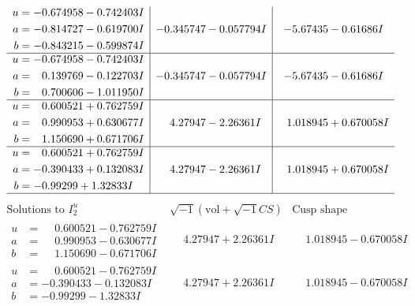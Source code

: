 \documentclass[1p]{elsarticle_modified}
\theoremstyle{definition}
\newcommand{\I}{\sqrt{-1}}
\begin{document}
$$\begin{array}{c|c|c}
\begin{aligned}
u &= -0.674958 - 0.742403 I \\
a &= -0.814727 - 0.619700 I \\
b &= -0.843215 - 0.599874 I\end{aligned}
 & -0.345747 - 0.057794 I & -5.67435 - 0.61686 I \\ \hline\begin{aligned}
u &= -0.674958 - 0.742403 I \\
a &= \phantom{-}0.139769 - 0.122703 I \\
b &= \phantom{-}0.700606 - 1.011950 I\end{aligned}
 & -0.345747 - 0.057794 I & -5.67435 - 0.61686 I \\ \hline\begin{aligned}
u &= \phantom{-}0.600521 + 0.762759 I \\
a &= \phantom{-}0.990953 + 0.630677 I \\
b &= \phantom{-}1.150690 + 0.671706 I\end{aligned}
 & \phantom{-}4.27947 - 2.26361 I & \phantom{-}1.018945 + 0.670058 I \\ \hline\begin{aligned}
u &= \phantom{-}0.600521 + 0.762759 I \\
a &= -0.390433 + 0.132083 I \\
b &= -0.99299 + 1.32833 I\end{aligned}
 & \phantom{-}4.27947 - 2.26361 I & \phantom{-}1.018945 + 0.670058 I\\
 \hline 
 \end{array}$$\newpage$$\begin{array}{c|c|c}  
\text{Solutions to }I^u_{2}& \I (\text{vol} + \sqrt{-1}CS) & \text{Cusp shape}\\
 \hline 
\begin{aligned}
u &= \phantom{-}0.600521 - 0.762759 I \\
a &= \phantom{-}0.990953 - 0.630677 I \\
b &= \phantom{-}1.150690 - 0.671706 I\end{aligned}
 & \phantom{-}4.27947 + 2.26361 I & \phantom{-}1.018945 - 0.670058 I \\ \hline\begin{aligned}
u &= \phantom{-}0.600521 - 0.762759 I \\
a &= -0.390433 - 0.132083 I \\
b &= -0.99299 - 1.32833 I\end{aligned}
 & \phantom{-}4.27947 + 2.26361 I & \phantom{-}1.018945 - 0.670058 I \\ \hline\begin{aligned}

\end{aligned}
\end{array}$$
\end{document}
